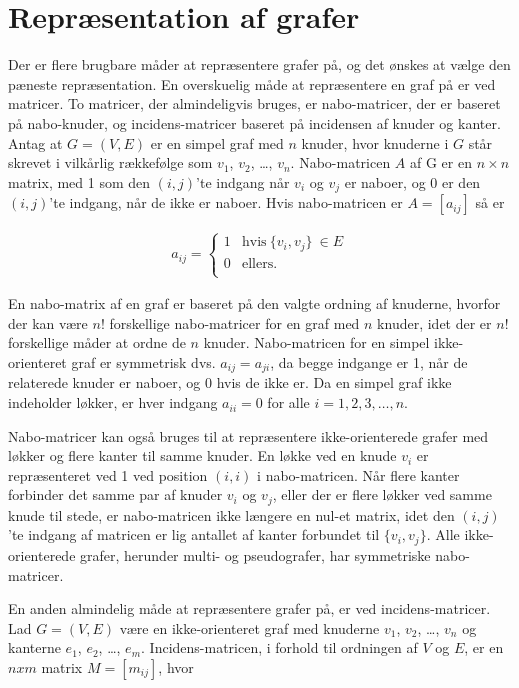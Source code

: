 \section{Repræsentation af grafer}
Der er flere brugbare måder at repræsentere grafer på, og det ønskes at vælge den pæneste repræsentation. 
En overskuelig måde at repræsentere en graf på er ved matricer. 
To matricer, der almindeligvis bruges, er nabo-matricer, der er baseret på nabo-knuder, og incidens-matricer baseret på incidensen af knuder og kanter. 
Antag at $G=(V,E)$ er en simpel graf med $n$ knuder, hvor knuderne i $G$ står skrevet i vilkårlig rækkefølge som $v_1$, $v_2$, \dots , $v_n$.
Nabo-matricen $A$  af G er en $n \times n$ matrix, med 1 som den $(i,j)$’te indgang når $v_i$ og $v_j$ er naboer, og 0 er den $(i,j)$’te indgang, når de ikke er naboer. Hvis nabo-matricen er $A=[a_{ij}]$ så er

\begin{align*}
	a_{ij}= \left\{\begin{array}{cc}
	1 & \textrm{hvis} \  \lbrace v_i, v_j \rbrace \  \in E \\
	0 & \textrm{ellers} .\\
	\end{array}\right.
\end{align*}

En nabo-matrix af en graf er baseret på den valgte ordning af knuderne, hvorfor der kan være $n!$ forskellige nabo-matricer for en graf med $n$ knuder, idet der er $n!$ forskellige måder at ordne de $n$ knuder.
Nabo-matricen for en simpel ikke-orienteret graf er symmetrisk dvs.
$a_{ij}=a_{ji}$, da begge indgange er 1, når de relaterede knuder er naboer, og 0 hvis de ikke er.
Da en simpel graf ikke indeholder løkker, er hver indgang $a_{ii}=0$ for alle $i=1,2,3, \dots ,n$. 

Nabo-matricer kan også bruges til at repræsentere ikke-orienterede grafer med løkker og flere kanter til samme knuder.
En løkke ved en knude $v_i$ er repræsenteret ved 1 ved position $(i,i)$ i nabo-matricen.
Når flere kanter forbinder det samme par af knuder $v_i$ og $v_j$, eller der er flere løkker ved samme knude til stede, er nabo-matricen ikke længere en nul-et matrix, idet den $(i,j)$’te indgang af matricen er lig antallet af kanter forbundet til $\lbrace v_i,v_j \rbrace$.
Alle ikke-orienterede grafer, herunder multi- og pseudografer, har symmetriske nabo-matricer.

En anden almindelig måde at repræsentere grafer på, er ved incidens-matricer.
Lad $G=(V,E)$ være en ikke-orienteret graf med knuderne $v_1$, $v_2$, \dots , $v_n$ og kanterne $e_1$, $e_2$, \dots , $e_m$. Incidens-matricen, i forhold til ordningen af $V$ og $E$, er en $n x m$ matrix $M=[m_{ij}]$, hvor 

